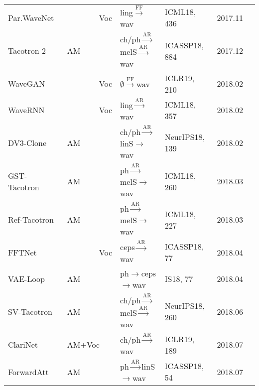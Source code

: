 \documentclass{article}
\begin{document}
\begin{center}
\begin{longtable}{l | l | l | l | l | l }
		Par.WaveNet~\cite{oord2018parallel}       & ~~~~~~~~Voc &  {\color{blue}ling}$\stackrel{\text{FF}}{\longrightarrow}$wav     & ICML18, 436 & 2017.11        \\
		Tacotron 2~\cite{shen2018natural}   & AM   &  {\color{blue}ch/ph}$\stackrel{\text{AR}}{\longrightarrow}${\color{red}melS}$\stackrel{\text{AR}}{\longrightarrow}$wav             & ICASSP18, 884 & 2017.12        \\
        WaveGAN~\cite{donahue2018adversarial}                & ~~~~~~~~Voc      & $\emptyset\stackrel{\text{FF}}{\longrightarrow}$wav          & ICLR19, 210 & 2018.02         \\
		WaveRNN~\cite{kalchbrenner2018efficient}                & ~~~~~~~~Voc      & {\color{green}ling}$\stackrel{\text{AR}}{\longrightarrow}$wav          & ICML18, 357 & 2018.02          \\
		DV3-Clone~\cite{arik2018neural}   & AM   &  {\color{blue}ch/ph}$\stackrel{\text{AR}}{\longrightarrow}${\color{red}linS}$\rightarrow$wav             & NeurIPS18, 139 & 2018.02        \\
		GST-Tacotron~\cite{wang2018style}   & AM   &  {\color{blue}ph}$\stackrel{\text{AR}}{\longrightarrow}${\color{red}melS}$\rightarrow$wav             & ICML18, 260 & 2018.03        \\
		Ref-Tacotron~\cite{skerry2018towards}   & AM   &  {\color{blue}ph}$\stackrel{\text{AR}}{\longrightarrow}${\color{red}melS}$\rightarrow$wav             & ICML18, 227 & 2018.03        \\
		FFTNet~\cite{jin2018fftnet}                 & ~~~~~~~~Voc      & {\color{red}ceps}$\stackrel{\text{AR}}{\longrightarrow}$wav          & ICASSP18, 77&  2018.04          \\
		VAE-Loop~\cite{akuzawa2018expressive}               & AM &{\color{blue}ph}$\rightarrow${\color{red}ceps}$\stackrel{}{\longrightarrow}$wav       & IS18, 77 & 2018.04     \\
		SV-Tacotron~\cite{jia2018transfer}   & AM   &  {\color{blue}ch/ph}$\stackrel{\text{AR}}{\longrightarrow}${\color{red}melS}$\stackrel{\text{AR}}{\longrightarrow}$wav             & NeurIPS18, 260 & 2018.06        \\
		ClariNet~\cite{ping2018clarinet}               & AM+Voc & {\color{blue}ch/ph}$\stackrel{\text{AR}}{\longrightarrow}$wav          & ICLR19, 189 & 2018.07     \\
		ForwardAtt~\cite{zhang2018forward}               & AM & {\color{blue}ph}$\stackrel{\text{AR}}{\longrightarrow}${\color{red}linS}$\rightarrow$wav          & ICASSP18, 54 & 2018.07     \\

\end{longtable}
\end{center}
\end{document}
